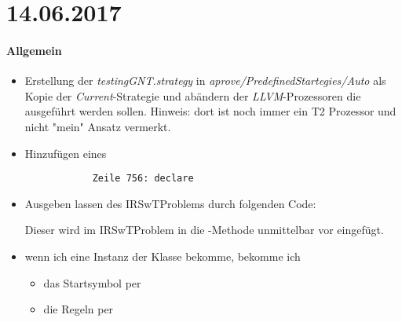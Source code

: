\section*{14.06.2017}

\paragraph{Allgemein}
\begin{itemize}
	\item Erstellung der \emph{testingGNT.strategy} in \emph{aprove/PredefinedStartegies/Auto} als Kopie der \emph{Current}-Strategie und abändern der \emph{LLVM}-Prozessoren die ausgeführt werden sollen. Hinweis: dort ist noch immer ein T2 Prozessor und nicht "mein" Ansatz vermerkt.
	\item Hinzufügen eines
		\begin{lstlisting}
			Zeile 756: declare 
		\end{lstlisting}
	\item Ausgeben lassen des IRSwTProblems durch folgenden Code:
		
		Dieser wird im IRSwTProblem in die -Methode unmittelbar vor  eingefügt.
	\item[\label{IRSwTProblemMethoden}\textbullet] wenn ich eine Instanz der Klasse  bekomme, bekomme ich
		\begin{itemize}
			\item das Startsymbol per 
			\item die Regeln per 
		\end{itemize}
\end{itemize}

